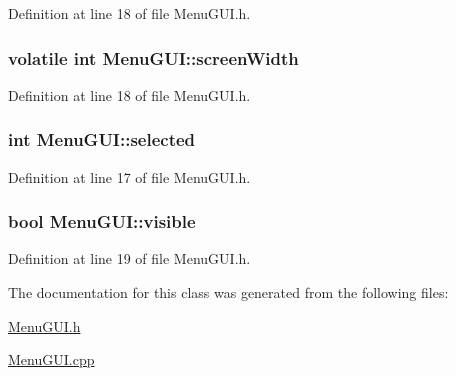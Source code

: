 Definition at line 18 of file Menu\-G\-U\-I.\-h.

\hypertarget{class_menu_g_u_i_a16ac33cf65fbb4ce84e076a71aeb6137}{
\subsubsection[{screen\-Width}]{\setlength{\rightskip}{0pt plus 5cm}volatile int Menu\-G\-U\-I\-::screen\-Width}}\label{class_menu_g_u_i_a16ac33cf65fbb4ce84e076a71aeb6137}


Definition at line 18 of file Menu\-G\-U\-I.\-h.

\hypertarget{class_menu_g_u_i_a6e978784cb9e9792dd96d935f9a2d1ca}{
\subsubsection[{selected}]{\setlength{\rightskip}{0pt plus 5cm}int Menu\-G\-U\-I\-::selected}}\label{class_menu_g_u_i_a6e978784cb9e9792dd96d935f9a2d1ca}


Definition at line 17 of file Menu\-G\-U\-I.\-h.

\hypertarget{class_menu_g_u_i_aeb5b730a3faea08895e234e1ad9ab53d}{
\subsubsection[{visible}]{\setlength{\rightskip}{0pt plus 5cm}bool Menu\-G\-U\-I\-::visible}}\label{class_menu_g_u_i_aeb5b730a3faea08895e234e1ad9ab53d}


Definition at line 19 of file Menu\-G\-U\-I.\-h.



The documentation for this class was generated from the following files\-:\begin{DoxyCompactItemize}
\item 
\hyperlink{_menu_g_u_i_8h}{Menu\-G\-U\-I.\-h}\item 
\hyperlink{_menu_g_u_i_8cpp}{Menu\-G\-U\-I.\-cpp}\end{DoxyCompactItemize}
